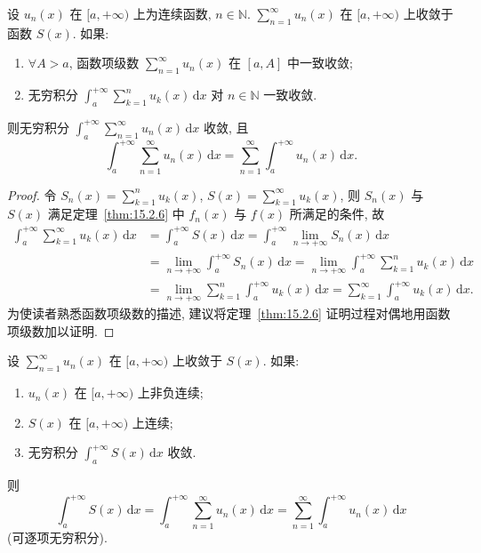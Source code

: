 \setcounter{theorem}{6}
\begin{theoremp}\label{thm:15.2.6p}
设 $u_{n}(x)$ 在 $[a,+\infty)$ 上为连续函数, $n\in\mathbb{N}$. $\displaystyle\sum_{n=1}^{\infty}u_{n}(x)$ 在 $[a,+\infty)$ 上收敛于函数 $S(x)$. 如果:
\begin{enumerate}
  \item $\forall A>a$, 函数项级数 $\displaystyle\sum_{n=1}^{\infty}u_{n}(x)$ 在 $[a,A]$ 中一致收敛;
  \item 无穷积分 $\displaystyle\int_{a}^{+\infty}\sum_{k=1}^{n}u_{k}(x)\,\mathrm{d}x$ 对 $n\in\mathbb{N}$ 一致收敛.
\end{enumerate}
则无穷积分 $\displaystyle\int_{a}^{+\infty}\sum_{n=1}^{\infty}u_{n}(x)\,\mathrm{d}x$ 收敛, 且
\[
  \int_{a}^{+\infty}\sum_{n=1}^{\infty}u_{n}(x)\,\mathrm{d}x=\sum_{n=1}^{\infty}\int_{a}^{+\infty}u_{n}(x)\,\mathrm{d}x.
\]
\end{theoremp}

\begin{proof}
令 $S_{n}(x)=\displaystyle\sum_{k=1}^{n}u_{k}(x)$, $S(x)=\displaystyle\sum_{k=1}^{\infty}u_{k}(x)$, 则 $S_{n}(x)$ 与 $S(x)$ 满足定理~\ref{thm:15.2.6} 中 $f_{n}(x)$ 与 $f(x)$ 所满足的条件, 故
\[
  \begin{aligned}
    \int_{a}^{+\infty}\sum_{k=1}^{\infty}u_{k}(x)\,\mathrm{d}x&=\int_{a}^{+\infty}S(x)\,\mathrm{d}x=\int_{a}^{+\infty}\lim_{n\to+\infty}S_{n}(x)\,\mathrm{d}x\\
    &=\lim_{n\to+\infty}\int_{a}^{+\infty}S_{n}(x)\,\mathrm{d}x=\lim_{n\to+\infty}\int_{a}^{+\infty}\sum_{k=1}^{n}u_{k}(x)\,\mathrm{d}x\\
    &=\lim_{n\to+\infty}\sum_{k=1}^{n}\int_{a}^{+\infty}u_{k}(x)\,\mathrm{d}x=\sum_{k=1}^{\infty}\int_{a}^{+\infty}u_{k}(x)\,\mathrm{d}x.
  \end{aligned}
\]
为使读者熟悉函数项级数的描述, 建议将定理~\ref{thm:15.2.6} 证明过程对偶地用函数项级数加以证明.
\end{proof}

\begin{theorem}\label{thm:15.2.7}
设 $\displaystyle\sum_{n=1}^{\infty}u_{n}(x)$ 在 $[a,+\infty)$ 上收敛于 $S(x)$. 如果:
\begin{enumerate}
  \item $u_{n}(x)$ 在 $[a,+\infty)$ 上非负连续;
  \item $S(x)$ 在 $[a,+\infty)$ 上连续;
  \item 无穷积分 $\displaystyle\int_{a}^{+\infty}S(x)\,\mathrm{d}x$ 收敛.
\end{enumerate}
则
\[
  \int_{a}^{+\infty}S(x)\,\mathrm{d}x=\int_{a}^{+\infty}\sum_{n=1}^{\infty}u_{n}(x)\,\mathrm{d}x=\sum_{n=1}^{\infty}\int_{a}^{+\infty}u_{n}(x)\,\mathrm{d}x
\]
(可逐项无穷积分).
\end{theorem}

